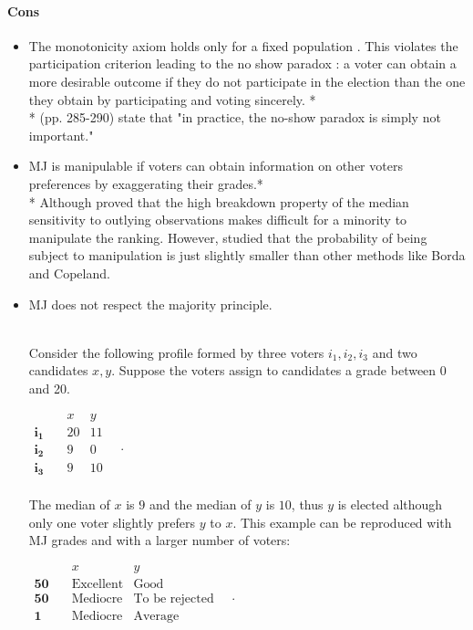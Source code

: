 \documentclass[version=3.21, pagesize, twoside=off, bibliography=totoc, DIV=calc, fontsize=12pt, a4paper]{scrartcl}
\begin{document}
\paragraph{Cons}
\begin{itemize}
	\item The monotonicity axiom holds only for a fixed population \citep{Felsenthal2008,Laslier2018}. This violates the participation criterion leading to the no show paradox \citep{Fishburn1983}: a voter can obtain a more desirable outcome if they do not participate in the election than the one they obtain by participating and voting sincerely. *\\
	* \citet{Balinski2011}(pp. 285-290) state that "in practice, the no-show paradox is simply not important."
	\item \acs{MJ} is manipulable if voters can obtain information on other voters preferences by exaggerating their grades.* \\
	* Although \citet{Bassett1999} proved that the high breakdown property of the median \textemdash sensitivity to outlying observations \textemdash makes difficult for a minority to manipulate the ranking. However, \citet{Gehrlein2003} studied that the probability of being subject to manipulation is just slightly smaller than other methods like Borda and Copeland.
	\item \acs{MJ} does not respect the majority principle.
	\begin{example}\citet{Laslier2018}\\ Consider the following profile formed by three voters $i_1, i_2, i_3$ and two candidates $x, y$. Suppose the voters assign to candidates a grade between 0 and 20.
		\begin{center}
			$
			\begin{array}{ccc}
				& x & y \\
				\mathbf{i_1} \quad &20&11\\
				\mathbf{i_2} \quad &9&0\\
				\mathbf{i_3} \quad &9&10\\
			\end{array}\quad .
			$
		\end{center}
		The median of $x$ is $9$ and the median of $y$ is $10$, thus $y$ is elected although only one voter slightly prefers $y$ to $x$. This example can be reproduced with \acs{MJ} grades and with a larger number of voters:
		\begin{center}
			$
			\begin{array}{ccc}
				& x & y \\
				\mathbf{50} \quad &\text{Excellent}&\text{Good}\\
				\mathbf{50} \quad &\text{Mediocre}&\text{To be rejected}\\
				\mathbf{1} \quad &\text{Mediocre}&\text{Average}\\
			\end{array}\quad .
			$
		\end{center}
	\label{ex:laslier}
	\end{example}
\end{itemize}
\end{document}
